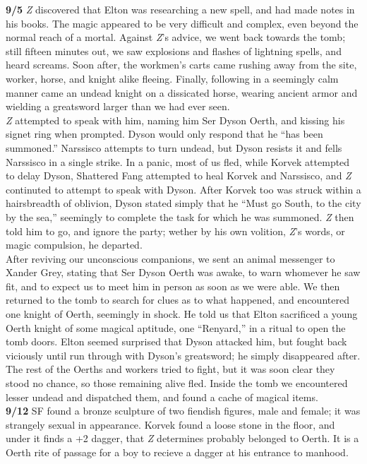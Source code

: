 \documentclass[letterpaper]{article}
\begin{document}
\noindent \textbf{9/5} \emph{Z} discovered that Elton was researching a new spell, and had made notes in his books.  The magic appeared to be very difficult and complex, even beyond the normal reach of a mortal.  Against \emph{Z}'s advice, we went back towards the tomb; still fifteen minutes out, we saw explosions and flashes of lightning spells, and heard screams.  Soon after, the workmen's carts came rushing away from the site, worker, horse, and knight alike fleeing.  Finally, following in a seemingly calm manner came an undead knight on a dissicated horse, wearing ancient armor and wielding a greatsword larger than we had ever seen.\\

\noindent \emph{Z} attempted to speak with him, naming him Ser Dyson Oerth, and kissing his signet ring when prompted.  Dyson would only respond that he ``has been summoned.'' Narssisco attempts to turn undead, but Dyson resists it and fells Narssisco in a single strike.  In a panic, most of us fled, while Korvek attempted to delay Dyson, Shattered Fang attempted to heal Korvek and Narssisco, and \emph{Z} continuted to attempt to speak with Dyson.  After Korvek too was struck within a hairsbreadth of oblivion, Dyson stated simply that he ``Must go South, to the city by the sea,'' seemingly to complete the task for which he was summoned.  \emph{Z} then told him to go, and ignore the party; wether by his own volition, \emph{Z}'s words, or magic compulsion, he departed.\\

\noindent After reviving our unconscious companions, we sent an animal messenger to Xander Grey, stating that Ser Dyson Oerth was awake, to warn whomever he saw fit, and to expect us to meet him in person as soon as we were able.  We then returned to the tomb to search for clues as to what happened, and encountered one knight of Oerth, seemingly in shock.  He told us that Elton sacrificed a young Oerth knight of some magical aptitude, one ``Renyard,'' in a ritual to open the tomb doors.  Elton seemed surprised that Dyson attacked him, but fought back viciously until run through with Dyson's greatsword; he simply disappeared after.  The rest of the Oerths and workers tried to fight, but it was soon clear they stood no chance, so those remaining alive fled.  Inside the tomb we encountered lesser undead and dispatched them, and found a cache of magical items. \\

\noindent \textbf{9/12} SF found a bronze sculpture of two fiendish figures, male and female; it was strangely sexual in appearance. Korvek found a loose stone in the floor, and under it finds a +2 dagger, that \emph{Z} determines probably belonged to Oerth.  It is a Oerth rite of passage for a boy to recieve a dagger at his entrance to manhood.  \\
\end{document}
